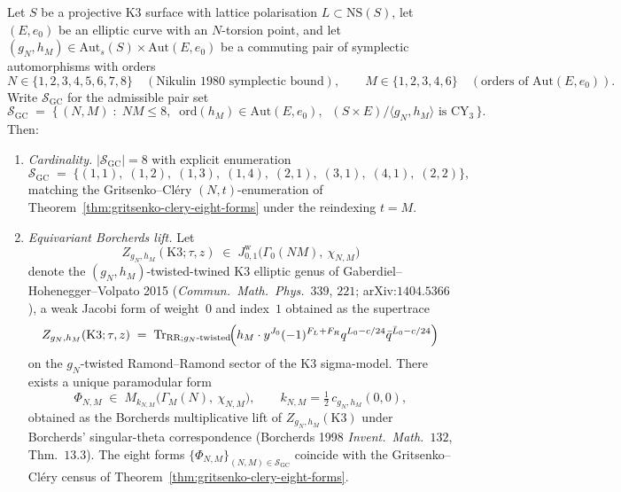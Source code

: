 \begin{conjecture}
\label{conj:gc-eight-form-equivariant-borcherds}
Let $S$ be a projective K3 surface with lattice polarisation
$L \subset \mathrm{NS}(S)$, let $(E, e_0)$ be an elliptic curve with
an $N$-torsion point, and let $(g_N, h_M) \in \mathrm{Aut}_s(S) \times
\mathrm{Aut}(E, e_0)$ be a commuting pair of symplectic automorphisms
with orders
\[
 N \in \{1, 2, 3, 4, 5, 6, 7, 8\}
 \quad (\text{Nikulin 1980 symplectic bound}),
\qquad
 M \in \{1, 2, 3, 4, 6\}
 \quad (\text{orders of } \mathrm{Aut}(E, e_0)).
\]
Write $\mathcal{S}_{\mathrm{GC}}$ for the admissible pair set
\[
 \mathcal{S}_{\mathrm{GC}}
 \;=\; \bigl\{\, (N, M) \;:\;
 N M \leq 8,\;\;
 \mathrm{ord}(h_M)\in \mathrm{Aut}(E, e_0),\;\;
 (S \times E)/\langle g_N, h_M \rangle \text{ is CY$_3$}\,\bigr\}.
\]
Then:
\begin{enumerate}[label=(\roman*), leftmargin=2em, itemsep=0.35ex]
\item \emph{Cardinality.}
$|\mathcal{S}_{\mathrm{GC}}| = 8$ with explicit enumeration
\[
 \mathcal{S}_{\mathrm{GC}}
 \;=\;
 \bigl\{
 (1, 1),\; (1, 2),\; (1, 3),\; (1, 4),\;
 (2, 1),\; (3, 1),\; (4, 1),\; (2, 2)
 \bigr\},
\]
matching the Gritsenko--Cl\'ery $(N, t)$-enumeration of
Theorem~\ref{thm:gritsenko-clery-eight-forms} under the reindexing
$t = M$.

\item \emph{Equivariant Borcherds lift.}
Let
\[
 Z_{g_N, h_M}(\mathrm{K3}; \tau, z)
 \;\in\; J^{\mathrm{w}}_{0, 1}\!\bigl(\Gamma_0(N M),\ \chi_{N, M}\bigr)
\]
denote the $(g_N, h_M)$-twisted-twined K3 elliptic genus of
Gaberdiel--Hohenegger--Volpato 2015
(\emph{Commun.\ Math.\ Phys.}~$339$, $221$; arXiv:$1404.5366$), a weak
Jacobi form of weight~$0$ and index~$1$ obtained as the supertrace
\[
 Z_{g_N, h_M}(\mathrm{K3}; \tau, z)
 \;=\;
 \mathrm{Tr}_{\mathrm{RR}; g_N\text{-twisted}}\!\Bigl(
 h_M \cdot y^{J_0} (-1)^{F_L + F_R} q^{L_0 - c/24} \bar{q}^{\bar{L}_0 - c/24}
 \Bigr)
\]
on the $g_N$-twisted Ramond--Ramond sector of the K3 sigma-model.
There exists a unique paramodular form
\[
 \Phi_{N, M} \;\in\; M_{k_{N, M}}\!\bigl(\Gamma_M(N),\ \chi_{N, M}\bigr),
\qquad
 k_{N, M} = \tfrac{1}{2}\, c_{g_N, h_M}(0, 0),
\]
obtained as the Borcherds multiplicative lift of
$Z_{g_N, h_M}(\mathrm{K3})$ under Borcherds' singular-theta
correspondence (Borcherds 1998 \emph{Invent.\ Math.}~$132$, Thm.~$13.3$).
The eight forms $\{\Phi_{N, M}\}_{(N, M) \in \mathcal{S}_{\mathrm{GC}}}$
coincide with the Gritsenko--Cl\'ery census of
Theorem~\ref{thm:gritsenko-clery-eight-forms}.


\end{enumerate}
\end{conjecture}

